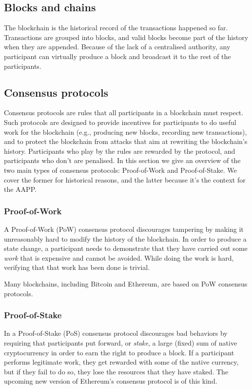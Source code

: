 \documentclass{article}
\begin{document}
\subsection{Blocks and chains}

The blockchain is the historical record of the transactions happened so far.
Transactions are grouped into blocks, and valid blocks become part of the
history when they are appended. Because of the lack of a centralised authority,
any participant can virtually produce a block and broadcast it to the rest of
the participants. 

\subsection{Consensus protocols}

Consensus protocols are rules that all participants in a blockchain must
respect. Such protocols are designed to provide incentives for participants to
do useful work for the blockchain (e.g., producing new blocks, recording new
transactions), and to protect the blockchain from attacks that aim at rewriting
the blockchain's history.  Participants who play by the rules are rewarded by
the protocol, and participants who don't are penalised. In this section we give
an overview of the two main types of consensus protocols: Proof-of-Work and
Proof-of-Stake.  We cover the former for historical reasons, and the latter
because it's the context for the AAPP.

\subsubsection{Proof-of-Work}

A Proof-of-Work (PoW) consensus protocol discourages tampering by making it
unreasonably hard to modify the history of the blockchain. In order to produce
a state change, a participant needs to demonstrate that they have carried out
some \emph{work} that is expensive and cannot be avoided. While doing the work
is hard, verifying that that work has been done is trivial.

Many blockchains, including Bitcoin and Ethereum, are based on PoW consensus
protocols.

\subsubsection{Proof-of-Stake}

In a Proof-of-Stake (PoS) consensus protocol discourages bad behaviors by
requiring that participants put forward, or \emph{stake}, a large (fixed) sum
of native cryptocurrency in order to earn the right to produce a block. If a
participant performs legitimate work, they get rewarded with some of the native
currency, but if they fail to do so, they lose the resources that they have
staked. The upcoming new version of Ethereum's consensus protocol is of this
kind.
\end{document}
